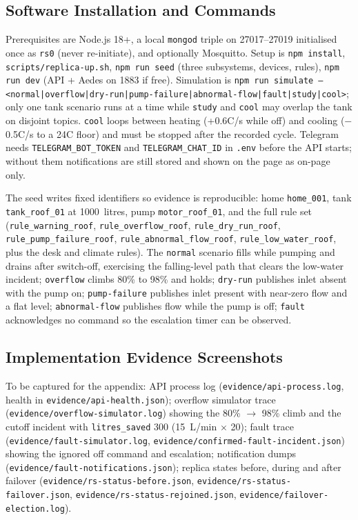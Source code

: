 \documentclass[11pt,a4paper]{article}
\begin{document}
\subsection{Software Installation and Commands}

Prerequisites are Node.js 18+, a local \texttt{mongod} triple on 27017--27019 initialised once as \texttt{rs0} (never re-initiate), and optionally Mosquitto. Setup is \texttt{npm install}, \texttt{scripts/replica-up.sh}, \texttt{npm run seed} (three subsystems, devices, rules), \texttt{npm run dev} (API + Aedes on 1883 if free). Simulation is \texttt{npm run simulate -- <normal|overflow|dry-run|pump-failure|abnormal-flow|fault|study|cool>}; only one tank scenario runs at a time while \texttt{study} and \texttt{cool} may overlap the tank on disjoint topics. \texttt{cool} loops between heating (+0.6\textdegree C/s while off) and cooling ($-$0.5\textdegree C/s to a 24\textdegree C floor) and must be stopped after the recorded cycle. Telegram needs \texttt{TELEGRAM\_BOT\_TOKEN} and \texttt{TELEGRAM\_CHAT\_ID} in \texttt{.env} before the API starts; without them notifications are still stored and shown on the page as on-page only.

The seed writes fixed identifiers so evidence is reproducible: home \texttt{home\_001}, tank \texttt{tank\_roof\_01} at 1000~litres, pump \texttt{motor\_roof\_01}, and the full rule set (\texttt{rule\_warning\_roof}, \texttt{rule\_overflow\_roof}, \texttt{rule\_dry\_run\_roof}, \texttt{rule\_pump\_failure\_roof}, \texttt{rule\_abnormal\_flow\_roof}, \texttt{rule\_low\_water\_roof}, plus the desk and climate rules). The \texttt{normal} scenario fills while pumping and drains after switch-off, exercising the falling-level path that clears the low-water incident; \texttt{overflow} climbs 80\% to 98\% and holds; \texttt{dry-run} publishes inlet absent with the pump on; \texttt{pump-failure} publishes inlet present with near-zero flow and a flat level; \texttt{abnormal-flow} publishes flow while the pump is off; \texttt{fault} acknowledges no command so the escalation timer can be observed.

\subsection{Implementation Evidence Screenshots}

To be captured for the appendix: API process log (\texttt{evidence/api-process.log}, health in \texttt{evidence/api-health.json}); overflow simulator trace (\texttt{evidence/overflow-simulator.log}) showing the 80\% $\rightarrow$ 98\% climb and the cutoff incident with \texttt{litres\_saved} 300 (15~L/min $\times$ 20); fault trace (\texttt{evidence/fault-simulator.log}, \texttt{evidence/confirmed-fault-incident.json}) showing the ignored off command and escalation; notification dumps (\texttt{evidence/fault-notifications.json}); replica states before, during and after failover (\texttt{evidence/rs-status-before.json}, \texttt{evidence/rs-status-failover.json}, \texttt{evidence/rs-status-rejoined.json}, \texttt{evidence/failover-election.log}).
\end{document}
